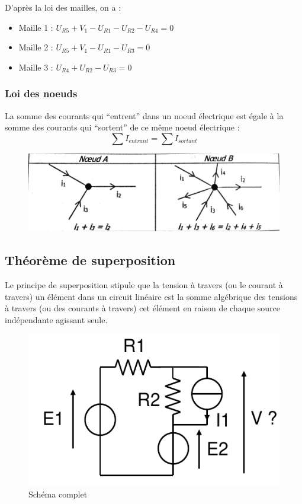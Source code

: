 \documentclass[a4paper,10pt]{article}
\begin{document}
D'après la loi des mailles, on a :
\begin{itemize}
 \item Maille 1 : $U_{R5} + V_1 - U_{R1} - U_{R2} - U_{R4} = 0$
 \item Maille 2 : $U_{R5} + V_1 - U_{R1} - U_{R3} = 0$
 \item Maille 3 : $U_{R4} + U_{R2} - U_{R3} = 0$
\end{itemize}



\subsubsection{Loi des noeuds}
La somme des courants qui ``entrent'' dans un noeud électrique est égale à la somme des courants qui ``sortent'' de ce même noeud électrique :
$$\sum I_{entrant} = \sum I_{sortant}$$
\begin{figure}[h]
 \begin{center}
  \includegraphics[width=\textwidth]{loisdesnoeuds}
 \end{center}
\end{figure}
\subsection{Théorème de superposition}
Le principe de superposition stipule que la tension à travers (ou le courant à travers) un élément dans un circuit linéaire est la somme algébrique des tensions à travers (ou des courants à travers) cet élément en raison de chaque source indépendante agissant seule.

\begin{figure}[h!]
 \begin{center}
  \includegraphics[scale=0.3]{superposition0}
  \caption{Schéma complet}
 \end{center}
\end{figure}
\end{document}
